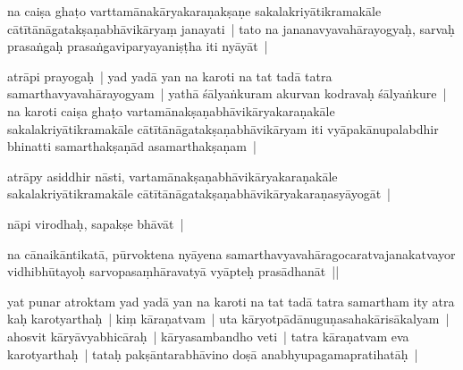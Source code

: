 \documentclass[article,12pt,a4paper]{memoir}%
\newcounter{parCount}
\begin{document}
	  
	  \pstart \leavevmode%
	\label{thakur75-69.8}na caiṣa ghaṭo varttamānakāryakaraṇakṣaṇe sakalakriyātikramakāle cātītānāgatakṣaṇabhāvikāryaṃ janayati | tato na jananavyavahārayogyaḥ, sarvaḥ prasaṅgaḥ prasaṅgaviparyayaniṣṭha iti nyāyāt |
	{}
	\pend%
      

	  
	  \pstart \leavevmode%
	\label{thakur75-69.11}atrāpi prayogaḥ | yad yadā yan na karoti na tat tadā tatra samarthavyavahārayogyam | yathā śālyaṅkuram akurvan kodravaḥ śālyaṅkure | na karoti caiṣa ghaṭo vartamānakṣaṇabhāvikāryakaraṇakāle sakalakriyātikramakāle cātītānāgatakṣaṇabhāvikāryam iti vyāpakānupalabdhir bhinatti samarthakṣaṇād asamarthakṣaṇam |
	{}
	\pend%
      

	  
	  \pstart \leavevmode%
	\label{thakur75-69.15}atrāpy asiddhir nāsti, vartamānakṣaṇabhāvikāryakaraṇakāle sakalakriyātikramakāle cātītānāgatakṣaṇabhāvikāryakaraṇasyāyogāt |
	{}
	\pend%
      

	  
	  \pstart \leavevmode%
	\label{thakur75-69.17}nāpi virodhaḥ, sapakṣe bhāvāt |
	{}
	\pend%
      

	  
	  \pstart \leavevmode%
	\label{thakur75-69.18}na cānaikāntikatā, pūrvoktena nyāyena samarthavyavahāragocaratvajanakatvayor vidhibhūtayoḥ sarvopasaṃhāravatyā vyāpteḥ prasādhanāt ||
	{}
	\pend%
      

	  
	  \pstart \leavevmode%
	\label{thakur75-69.20}yat punar atroktam yad yadā yan na karoti na tat tadā tatra samartham ity atra kaḥ karotyarthaḥ | kiṃ kāraṇatvam | uta kāryotpādānuguṇasahakārisākalyam | ahosvit kāryāvyabhicāraḥ | kāryasambandho veti | tatra kāraṇatvam eva karotyarthaḥ | tataḥ pakṣāntarabhāvino doṣā anabhyupagamapratihatāḥ |
	{}
	\pend%
      
\end{document}
